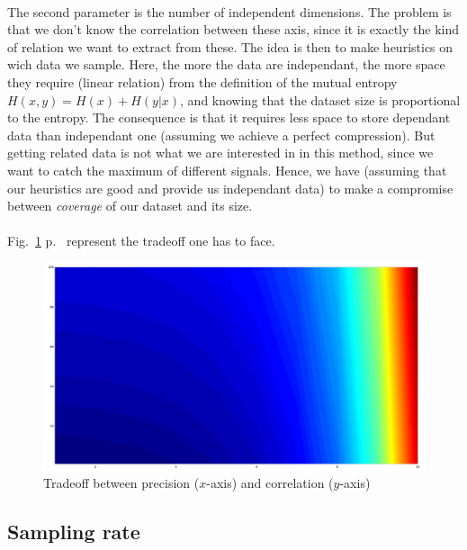 \documentclass[twoside]{report}
\begin{document}
	\paragraph{}
	The second parameter is the number of independent dimensions. The problem is that we don't know the correlation between these axis, since it is exactly the kind of relation we want to extract from these. The idea is then to make heuristics on wich data we sample. Here, the more the data are independant, the more space they require (linear relation) from the definition of the mutual entropy $H(x,y) = H(x)+H(y|x)$, and knowing that the dataset size is proportional to the entropy. The consequence is that it requires less space to store dependant data than independant one (assuming we achieve a perfect compression). But getting related data is not what we are interested in in this method, since we want to catch the maximum of different signals. Hence, we have (assuming that our heuristics are good and provide us independant data) to make a compromise between \emph{coverage} of our dataset and its size.
	\paragraph{}
	Fig.~\ref{fig:tradeoff} p.~\pageref{fig:tradeoff} represent the tradeoff one has to face.
	\begin{figure}
		\begin{center}
			\includegraphics[width=\textwidth]{tradeoff_m2.png}
			\caption{Tradeoff between precision ($x$-axis) and correlation ($y$-axis)}
			\label{fig:tradeoff}
		\end{center}
	\end{figure}
	\subsection{Sampling rate}
\end{document}
